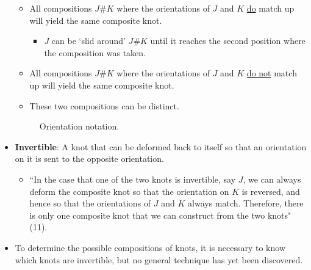 \documentclass[titlepage]{article}
\numberwithin{figure}{section}
\numberwithin{table}{section}
\numberwithin{equation}{section}
\newcommand{\dq}[2]{``#1" (#2).}
\begin{document}
\begin{itemize}
\begin{itemize}
        \item All compositions $J\#K$ where the orientations of $J$ and $K$ \underline{do} match up will yield the same composite knot.
        \begin{itemize}
            \item $J$ can be `slid around' $J\#K$ until it reaches the second position where the composition was taken.
        \end{itemize}
        \item All compositions $J\#K$ where the orientations of $J$ and $K$ \underline{do not} match up will yield the same composite knot.
        \item These two compositions can be distinct.
    \end{itemize}
    \begin{figure}[h!]
        \centering
        \vspace{-0.8cm}
        \caption{Orientation notation.}
        \label{fig:orientnotation}
    \end{figure}
    \item \textbf{Invertible}: A knot that can be deformed back to itself so that an orientation on it is sent to the opposite orientation.
    \begin{itemize}
        \item \dq{In the case that one of the two knots is invertible, say $J$, we can always deform the composite knot so that the orientation on $K$ is reversed, and hence so that the orientations of $J$ and $K$ always match. Therefore, there is only one composite knot that we can construct from the two knots}{11}
    \end{itemize}
    \item To determine the possible compositions of knots, it is necessary to know which knots are invertible, but no general technique has yet been discovered.
\end{itemize}
\end{document}
